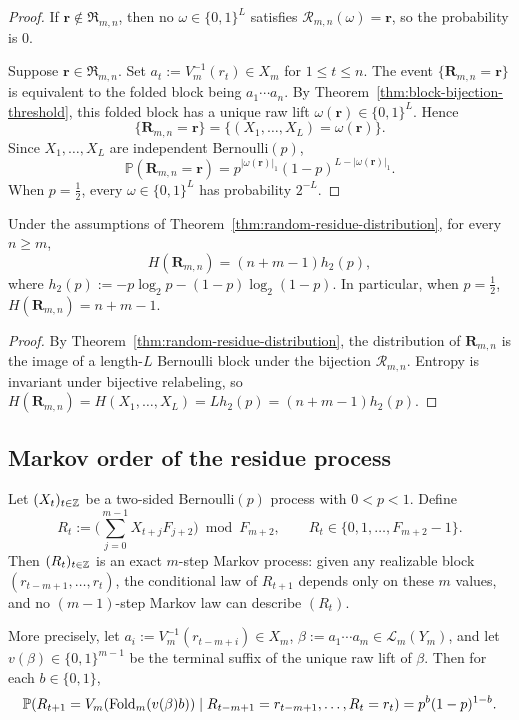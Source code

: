 \begin{proof}
If $\mathbf r\notin\mathfrak R_{m,n}$, then no
$\omega\in\{0,1\}^L$ satisfies $\mathcal R_{m,n}(\omega)=\mathbf r$, so the
probability is $0$.

Suppose $\mathbf r\in\mathfrak R_{m,n}$.  Set
$a_t:=V_m^{-1}(r_t)\in X_m$ for $1\le t\le n$.  The event
$\{\mathbf R_{m,n}=\mathbf r\}$ is equivalent to the folded block being
$a_1\cdots a_n$.  By Theorem~\ref{thm:block-bijection-threshold}, this
folded block has a unique raw lift $\omega(\mathbf r)\in\{0,1\}^L$.  Hence
\[
\{\mathbf R_{m,n}=\mathbf r\}
=
\{(X_1,\ldots,X_L)=\omega(\mathbf r)\}.
\]
Since $X_1,\ldots,X_L$ are independent Bernoulli$(p)$,
\[
\mathbb P(\mathbf R_{m,n}=\mathbf r)
=
p^{|\omega(\mathbf r)|_1}(1-p)^{L-|\omega(\mathbf r)|_1}.
\]
When $p=\tfrac12$, every $\omega\in\{0,1\}^L$ has probability $2^{-L}$.
\end{proof}

\begin{corollary}
\label{cor:entropy-random-residues}
Under the assumptions of Theorem~\textup{\ref{thm:random-residue-distribution}},
for every $n\ge m$,
\[
H(\mathbf R_{m,n})=(n+m-1)h_2(p),
\]
where $h_2(p):=-p\log_2 p-(1-p)\log_2(1-p)$.  In particular, when
$p=\tfrac12$, $H(\mathbf R_{m,n})=n+m-1$.
\end{corollary}

\begin{proof}
By Theorem~\ref{thm:random-residue-distribution}, the distribution of
$\mathbf R_{m,n}$ is the image of a length-$L$ Bernoulli block under the
bijection $\mathcal R_{m,n}$.  Entropy is invariant under bijective relabeling,
so $H(\mathbf R_{m,n})=H(X_1,\ldots,X_L)=Lh_2(p)=(n+m-1)h_2(p)$.
\end{proof}

\subsection{Markov order of the residue process}

\begin{theorem}
\label{thm:residue-markov-order}
Let $(X_t)_{t\in\mathbb{Z}}$ be a two-sided Bernoulli$(p)$ process with $0<p<1$.
Define
\[
R_t:=
\biggl(\sum_{j=0}^{m-1}X_{t+j}F_{j+2}\biggr)\bmod F_{m+2},
\qquad
R_t\in\{0,1,\ldots,F_{m+2}-1\}.
\]
Then $(R_t)_{t\in\mathbb{Z}}$ is an exact $m$-step Markov process: given any
realizable block $(r_{t-m+1},\ldots,r_t)$, the conditional law of $R_{t+1}$
depends only on these $m$ values, and no $(m-1)$-step Markov law can describe
$(R_t)$.

More precisely, let $a_i:=V_m^{-1}(r_{t-m+i})\in X_m$,
$\beta:=a_1\cdots a_m\in\mathcal L_m(Y_m)$, and let
$v(\beta)\in\{0,1\}^{m-1}$ be the terminal suffix of the unique raw lift of
$\beta$.  Then for each $b\in\{0,1\}$,
\[
\mathbb P\!\left(
R_{t+1}=V_m(\operatorname{Fold}_m(v(\beta)b))
\;\middle\vert\;
R_{t-m+1}=r_{t-m+1},\ldots,R_t=r_t
\right)
=
p^b(1-p)^{1-b}.
\]
\end{theorem}

